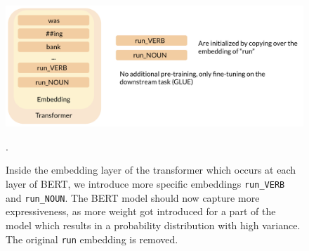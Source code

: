\documentclass[a4paper,12pt,twoside,openright]{report}
\begin{document}
\begin{figure}
	\center
  \includegraphics[width=\linewidth]{./assets/experiments/pipeline_model_BERnie_POS_initialization.png}
  \caption{Inside the embedding layer of the transformer which occurs at each layer of BERT, we introduce more specific embeddings \texttt{run\_VERB} and \texttt{run\_NOUN}. The BERT model should now capture more expressiveness, as more weight got introduced for a part of the model which results in a probability distribution with high variance. The original \texttt{run} embedding is removed.}.
  \label{fig:BERnie_POS_initialization}
\end{figure}
\end{document}
